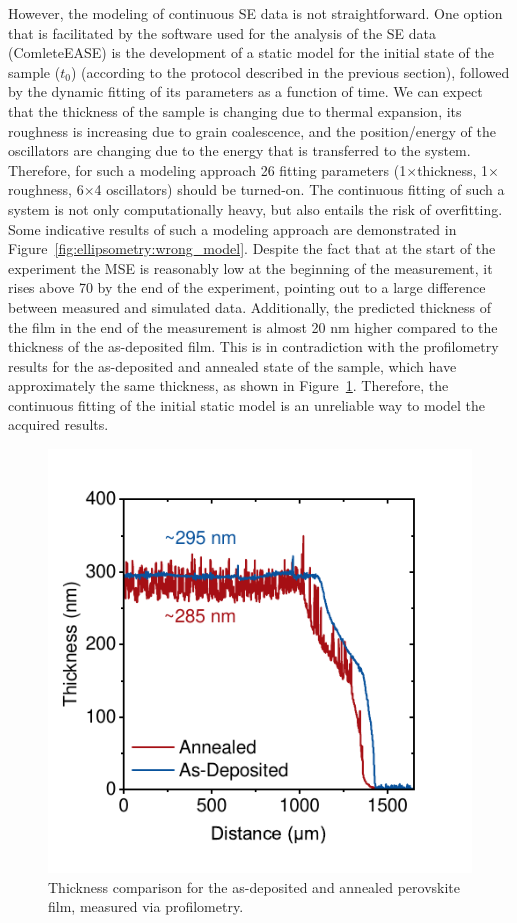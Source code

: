 However, the modeling of continuous SE data is not straightforward. One option that is facilitated by the software used for the analysis of the SE data (ComleteEASE) is the development of a static model for the initial state of the sample ($t_0$) (according to the protocol described in the previous section), followed by the dynamic fitting of its parameters as a function of time. We can expect that the thickness of the sample is changing due to thermal expansion, its roughness is increasing due to grain coalescence, and the position/energy of the oscillators are changing due to the energy that is transferred to the system. Therefore, for such a modeling approach 26 fitting parameters (1$\times$thickness, 1$\times$roughness, 6$\times$4 oscillators) should be turned-on. The continuous fitting of such a system is not only computationally heavy, but also entails the risk of overfitting. Some indicative results of such a modeling approach are demonstrated in Figure~\ref{fig:ellipsometry:wrong_model}. Despite the fact that at the start of the experiment the MSE is reasonably low at the beginning of the measurement, it rises above 70 by the end of the experiment, pointing out to a large difference between measured and simulated data. Additionally, the predicted thickness of the film in the end of the measurement is almost 20 nm higher compared to the thickness of the as-deposited film. This is in contradiction with the profilometry results for the as-deposited and annealed state of the sample, which have approximately the same thickness, as shown in Figure~\ref{fig:ellipsometry:profilometry}. Therefore, the continuous fitting of the initial static model is an unreliable way to model the acquired results. 


\begin{figure}
  \centering
  \medskip
  \includegraphics[width=.45\textwidth]{chapters/ellipsometry/image/Dektak.pdf}
  \caption{Thickness comparison for the as-deposited and annealed perovskite film, measured via profilometry.}
  \label{fig:ellipsometry:profilometry}
\end{figure}


